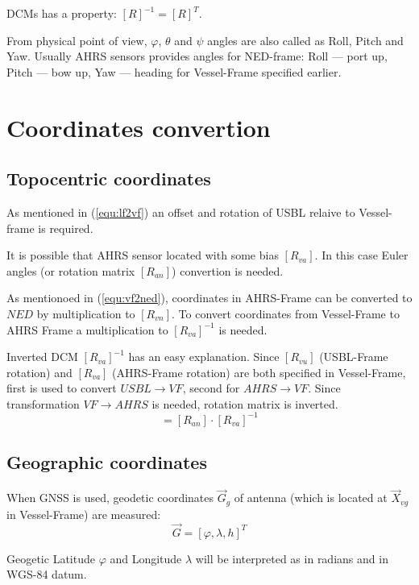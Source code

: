 \documentclass[10pt,letterpaper]{article}
\numberwithin{equation}{section}
\numberwithin{figure}{section}
\numberwithin{table}{section}
\begin{document}
DCMs has a property: $[R]^{-1} = [R]^{T}$.

From physical point of view, $\varphi$, $\theta$ and $\psi$ angles are also called as
Roll, Pitch and Yaw. Usually AHRS sensors provides angles for NED-frame: Roll --- port up,
Pitch --- bow up, Yaw --- heading for Vessel-Frame specified earlier.


\section{Coordinates convertion}


\subsection{Topocentric coordinates}

As mentioned in (\ref{equ:lf2vf}) an offset and rotation of USBL relaive to
Vessel-frame is required.

It is possible that AHRS sensor located with some bias $[R_{va}]$. In this case
Euler angles (or rotation matrix $[R_{an}]$) convertion is needed.

As mentionoed in (\ref{equ:vf2ned}), coordinates in AHRS-Frame can be converted
to $NED$ by multiplication to $[R_{vn}]$. To convert coordinates from Vessel-Frame
to AHRS Frame a multiplication to $[R_{va}]^{-1}$ is needed.

Inverted DCM $[R_{va}]^{-1}$ has an easy explanation. Since $[R_{vu}]$ (USBL-Frame
rotation) and $[R_{va}]$ (AHRS-Frame rotation) are both specified in Vessel-Frame,
first is used to convert $USBL \rightarrow VF$, second for $AHRS \rightarrow VF$.
Since transformation $VF \rightarrow AHRS$ is needed, rotation matrix is inverted.
\begin{equation}
    [R_{vn}] = [R_{an}] \cdot [R_{va}]^{-1}
\end{equation}


\subsection{Geographic coordinates}

When GNSS is used, geodetic coordinates $\vec{G}_{g}$ of antenna (which is
located at $\vec{X}_{vg}$ in Vessel-Frame) are measured:
\begin{equation}
    \vec{G} = [ \varphi, \lambda, h ]^{T}
\end{equation}

Geogetic Latitude $\varphi$ and Longitude $\lambda$ will be interpreted as in
radians and in WGS-84 datum.
\end{document}
